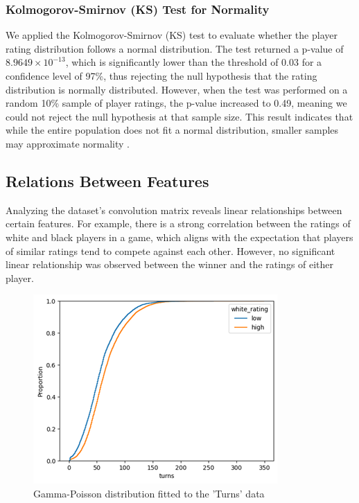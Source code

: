 \documentclass[conference]{IEEEtran}
\begin{document}
\subsubsection{Kolmogorov-Smirnov (KS) Test for Normality}
We applied the Kolmogorov-Smirnov (KS) test to evaluate whether the player rating distribution follows a normal distribution. The test returned a p-value of \(8.9649 \times 10^{-13}\), which is significantly lower than the threshold of \(0.03\) for a confidence level of 97\%, thus rejecting the null hypothesis that the rating distribution is normally distributed. However, when the test was performed on a random 10\% sample of player ratings, the p-value increased to 0.49, meaning we could not reject the null hypothesis at that sample size. This result indicates that while the entire population does not fit a normal distribution, smaller samples may approximate normality \cite{kssample}.

\subsection{Relations Between Features}
Analyzing the dataset’s convolution matrix reveals linear relationships between certain features. For example, there is a strong correlation between the ratings of white and black players in a game, which aligns with the expectation that players of similar ratings tend to compete against each other. However, no significant linear relationship was observed between the winner and the ratings of either player.

\begin{figure}[H]
    \centering
    \includegraphics[width=0.8\linewidth]{ratingecdf.png}
    \caption{Gamma-Poisson distribution fitted to the 'Turns' data}
    \label{fig:ecdf_plot}
\end{figure}
\end{document}
